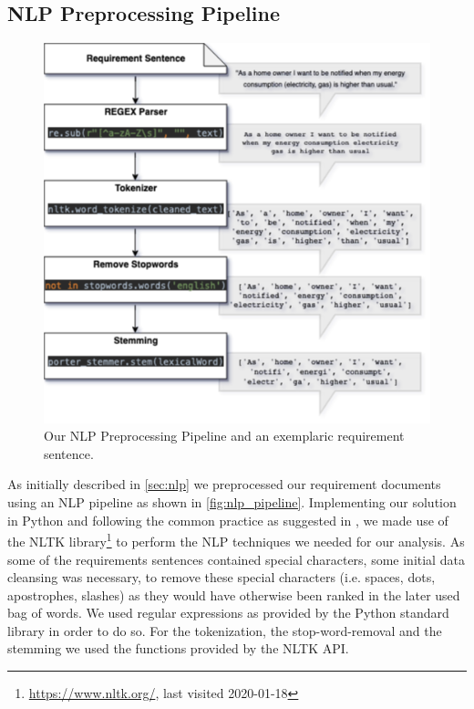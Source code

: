 \subsection{NLP Preprocessing Pipeline} %
\label{sub:own_pipeline}

\begin{figure}[ht]
  \centering
    \includegraphics[width=\textwidth]{figures/NLP Pipeline.png}
    \caption{Our NLP Preprocessing Pipeline and an exemplaric requirement sentence.}
    \label{fig:nlp_pipeline}
\end{figure}

As initially described in \autoref{sec:nlp} we preprocessed our requirement documents using an NLP pipeline as shown in \autoref{fig:nlp_pipeline}. Implementing our solution in Python and following the common practice as suggested in \cite{ferrari_natural_2018}, we made use of the NLTK library\footnote{\url{https://www.nltk.org/}, last visited 2020-01-18} to perform the NLP techniques we needed for our analysis. As some of the requirements sentences contained special characters, some initial data cleansing was necessary, to remove these special characters (i.e. spaces, dots, apostrophes, slashes) as they would have otherwise been ranked in the later used bag of words. We used regular expressions as provided by the Python standard library in order to do so. For the tokenization, the stop-word-removal and the stemming we used the functions provided by the NLTK API.

